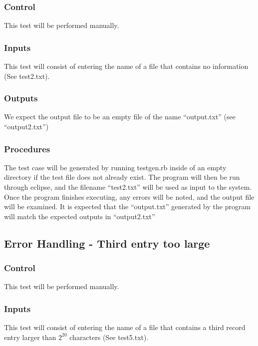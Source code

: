 \documentclass[]{article}
\begin{document}
	\subsubsection{Control}
	This test will be performed manually.
	
	\subsubsection{Inputs}
	This test will consist of entering the name of a file that contains no
	information (See test2.txt).
	
	\subsubsection{Outputs}
	We expect the output file to be an empty file of the name ``output.txt''
	(see ``output2.txt'')
	
	\subsubsection{Procedures}
	The test case will be generated by running testgen.rb inside of an empty
	directory if the test file does not already exist.  The program will then be
	run through eclipse, and the filename ``test2.txt'' will be used as input to
	the system.  Once the program finishes executing, any errors will be noted, and
	the output file will be examined.  It is expected that the ``output.txt''
	generated by the program will match the expected outputs in ``output2.txt'' 
	

\subsection{Error Handling - Third entry too large}
	\subsubsection{Control}
	This test will be performed manually.
	
	\subsubsection{Inputs}
	This test will consist of entering the name of a file that contains a third
	record entry larger than $2^{20}$ characters (See test5.txt).
	
\end{document}
